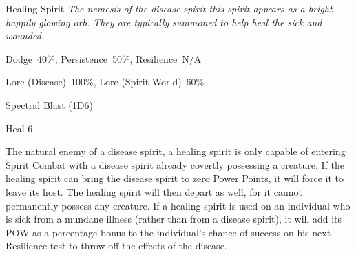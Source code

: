 \begin{samepage}
\begin{monsterbox}{Healing Spirit}
	\textit{The nemesis of the disease spirit this spirit appears as a bright happily glowing orb. They are typically summoned to help heal the sick and wounded.}\\
	\rpghline
	\basics[%
	powerpoints = 14,
	movementrate = 30m,
	plunderrating = 0
	]
	\rpghline%
	\stats[ %
		STR = -,
		CON = -,
		DEX = -,
		SIZ = -,
		INT = 2D6    (7),
		POW = 4D6    (14),
		CHA = 3D6    (11)
	]
	\rpghline%
	\begin{rpg-monsteraction}[Resistances]
		Dodge~40\%, Persistence~50\%, Resilience~N/A
	\end{rpg-monsteraction}
	\begin{rpg-monsteraction}[Knowledge]
		Lore (Disease)~100\%, Lore (Spirit World)~60\%
	\end{rpg-monsteraction}
	\begin{rpg-monsteraction}
		Spectral Blast (1D6)
	\end{rpg-monsteraction}
	\begin{rpg-monsteraction}[Magic 100\%]
		Heal 6
	\end{rpg-monsteraction}
	\begin{rpg-monsteraction}
		The natural enemy of a disease spirit, a healing spirit is only capable of entering Spirit Combat with a disease spirit already covertly possessing a creature. If the healing spirit can bring the disease spirit to zero Power Points, it will force it to leave its host. The healing spirit will then depart as well, for it cannot permanently possess any creature. If a healing spirit is used on an individual who is sick from a mundane illness (rather than from a disease spirit), it will add its POW as a percentage bonus to the individual’s chance of success on his next Resilience test to throw off the effects of the disease.
	\end{rpg-monsteraction}
\end{monsterbox}
\end{samepage}


